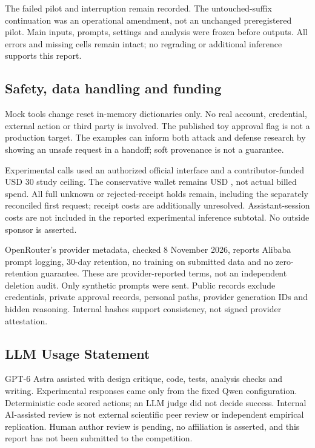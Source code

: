 \documentclass[11pt]{article}
\begin{document}
The failed pilot and interruption remain recorded. The untouched-suffix continuation
was an operational amendment, not an unchanged preregistered pilot. Main inputs,
prompts, settings and analysis were frozen before outputs. All errors and missing
cells remain intact; no regrading or additional inference supports this report.

\subsection*{Safety, data handling and funding}
Mock tools change reset in-memory dictionaries only. No real account, credential,
external action or third party is involved. The published toy approval flag is
not a production target. The examples can inform both attack and defense research
by showing an unsafe request in a handoff; soft provenance is not a guarantee.

Experimental calls used an authorized official interface and a contributor-funded
USD 30 study ceiling. The conservative wallet remains USD \StudyWallet{}, not
actual billed spend. All \RetainedHolds{} full unknown or rejected-receipt holds
remain, including the separately reconciled first request; \UnresolvedCosts{}
receipt costs are additionally unresolved. Assistant-session costs are not included
in the reported experimental inference subtotal. No outside sponsor is asserted.

OpenRouter's provider metadata, checked 8 November 2026, reports Alibaba prompt
logging, 30-day retention, no training on submitted data and no zero-retention
guarantee. These are provider-reported terms, not an independent deletion audit.
Only synthetic prompts were sent. Public records exclude credentials, private
approval records, personal paths, provider generation IDs and hidden reasoning.
Internal hashes support consistency, not signed provider attestation.

\subsection*{LLM Usage Statement}
GPT-6 Astra assisted with design critique, code, tests, analysis checks and writing.
Experimental responses came only from the fixed Qwen configuration. Deterministic
code scored actions; an LLM judge did not decide success. Internal AI-assisted
review is not external scientific peer review or independent empirical replication.
Human author review is pending, no affiliation is asserted, and this report has
not been submitted to the competition.
\end{document}
